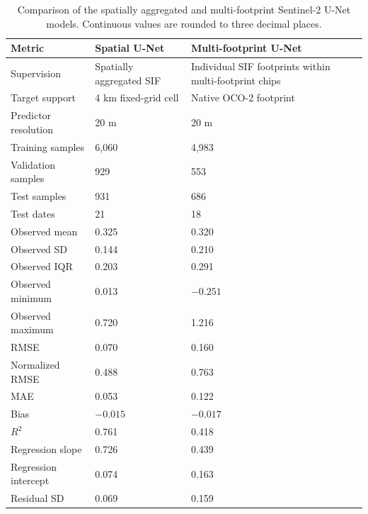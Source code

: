 
\begin{table}[p]
\centering
\small
\renewcommand{\arraystretch}{1.12}
\caption[Comparison of the two Sentinel-2 U-Net models]{Comparison of the spatially aggregated and multi-footprint Sentinel-2 U-Net models. Continuous values are rounded to three decimal places.}
\label{tab:rq3_model_comparison}

\begin{tabular}{@{}p{}p{}p{}@{}}
\hline
\textbf{Metric} & \textbf{Spatial U-Net} & \textbf{Multi-footprint U-Net} \\
\hline
Supervision & Spatially aggregated SIF & Individual SIF footprints within multi-footprint chips \\
Target support & 4 km fixed-grid cell & Native OCO-2 footprint \\
Predictor resolution & 20 m & 20 m \\
\hline
Training samples & 6,060 & 4,983 \\
Validation samples & 929 & 553 \\
Test samples & 931 & 686 \\
Test dates & 21 & 18 \\
\hline
Observed mean & 0.325 & 0.320 \\
Observed SD & 0.144 & 0.210 \\
Observed IQR & 0.203 & 0.291 \\
Observed minimum & 0.013 & $-0.251$ \\
Observed maximum & 0.720 & 1.216 \\
\hline
RMSE & 0.070 & 0.160 \\
Normalized RMSE & 0.488 & 0.763 \\
MAE & 0.053 & 0.122 \\
Bias & $-0.015$ & $-0.017$ \\
$R^2$ & 0.761 & 0.418 \\
Regression slope & 0.726 & 0.439 \\
Regression intercept & 0.074 & 0.163 \\
Residual SD & 0.069 & 0.159 \\
\hline
\end{tabular}
\end{table}

